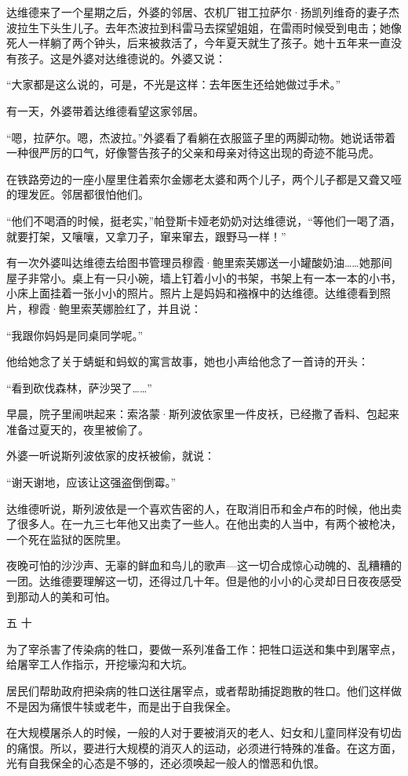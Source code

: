 达维德来了一个星期之后，外婆的邻居、农机厂钳工拉萨尔·扬凯列维奇的妻子杰波拉生下头生儿子。去年杰波拉到科雷马去探望姐姐，在雷雨时候受到电击；她像死人一样躺了两个钟头，后来被救活了，今年夏天就生了孩子。她十五年来一直没有孩子。这是外婆对达维德说的。外婆又说：

“大家都是这么说的，可是，不光是这样：去年医生还给她做过手术。”

有一天，外婆带着达维德看望这家邻居。

“嗯，拉萨尔。嗯，杰波拉。”外婆看了看躺在衣服篮子里的两脚动物。她说话带着一种很严厉的口气，好像警告孩子的父亲和母亲对待这出现的奇迹不能马虎。

在铁路旁边的一座小屋里住着索尔金娜老太婆和两个儿子，两个儿子都是又聋又哑的理发匠。邻居都很怕他们。

“他们不喝酒的时候，挺老实，”帕登斯卡娅老奶奶对达维德说，“等他们一喝了酒，就要打架，又嚷嚷，又拿刀子，窜来窜去，跟野马一样！”

有一次外婆叫达维德去给图书管理员穆霞·鲍里索芙娜送一小罐酸奶油……她那间屋子非常小。桌上有一只小碗，墙上钉着小小的书架，书架上有一本一本的小书，小床上面挂着一张小小的照片。照片上是妈妈和襁褓中的达维德。达维德看到照片，穆霞·鲍里索芙娜脸红了，并且说：

“我跟你妈妈是同桌同学呢。”

他给她念了关于蜻蜓和蚂蚁的寓言故事，她也小声给他念了一首诗的开头：

“看到砍伐森林，萨沙哭了……”

早晨，院子里闹哄起来：索洛蒙·斯列波依家里一件皮袄，已经撒了香料、包起来准备过夏天的，夜里被偷了。

外婆一听说斯列波依家的皮袄被偷，就说：

“谢天谢地，应该让这强盗倒倒霉。”

达维德听说，斯列波依是一个喜欢告密的人，在取消旧币和金卢布的时候，他出卖了很多人。在一九三七年他又出卖了一些人。在他出卖的人当中，有两个被枪决，一个死在监狱的医院里。

夜晚可怕的沙沙声、无辜的鲜血和鸟儿的歌声—这一切合成惊心动魄的、乱糟糟的一团。达维德要理解这一切，还得过几十年。但是他的小小的心灵却日日夜夜感受到那动人的美和可怕。

五 十

为了宰杀害了传染病的牲口，要做一系列准备工作：把牲口运送和集中到屠宰点，给屠宰工人作指示，开挖壕沟和大坑。

居民们帮助政府把染病的牲口送往屠宰点，或者帮助捕捉跑散的牲口。他们这样做不是因为痛恨牛犊或老牛，而是出于自我保全。

在大规模屠杀人的时候，一般的人对于要被消灭的老人、妇女和儿童同样没有切齿的痛恨。所以，要进行大规模的消灭人的运动，必须进行特殊的准备。在这方面，光有自我保全的心态是不够的，还必须唤起一般人的憎恶和仇恨。

